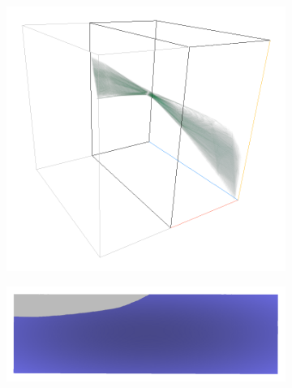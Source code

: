 \documentclass[a4paper,fontsize=12pt,toc=bib,halfparskip,ngerman]{scrartcl}
\begin{document}
\begin{figure}
	\begin{subfigure}{0.4\textwidth}
		\centering
		\includegraphics[width=\textwidth]{pictures/results/Beam/Beam_InvariantSpace1.png}
		\subcaption{}
		\label{BeamInvariant1}
	\end{subfigure}
	\hspace*{\fill}
	\begin{subfigure}{0.4\textwidth}
		\centering
		\includegraphics[width=\textwidth]{pictures/results/Beam/Beam_Object1.png}
		\subcaption{}
		\label{BeamObject1}
	\end{subfigure}
	\medskip
	\begin{subfigure}{0.4\textwidth}
		\centering

\end{subfigure}
\end{figure}
\end{document}
